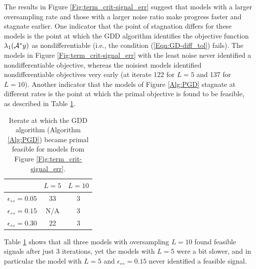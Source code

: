 The results in Figure \ref{Fig:term_crit-signal_err} suggest that models with a larger oversampling rate and those with a larger noise ratio make progress faster and stagnate earlier.  One indicator that the point of stagnation differs for these models is the point at which the GDD algorithm identifies the objective function $\lambda_1({\mathcal A}^*y)$ as nondifferentiable (i.e., the condition (\ref{Eqn:GD-diff_tol}) fails).  The models in Figure \ref{Fig:term_crit-signal_err} with the least noise never identified a nondifferentiable objective, whereas the noisiest models identified nondifferentiable objectives very early (at iterate 122 for $L=5$ and 137 for $L=10$).  Another indicator that the models of Figure \ref{Alg:PGD} stagnate at different rates is the point at which the primal objective is found to be feasible, as described in Table \ref{Tab:term_crit-pr_feas_faster_for_big_L_noise}.

\begin{table}[H]
\centering
\begin{tabular}{ |c|c|c| }
\hline
&	$L = 5$
	&	$L = 10$	\\
 \hline
$\epsilon_\rel = 0.05$
&     33 &   3 		\\
 \hline
$\epsilon_\rel = 0.15$
&  N/A &  3 	\\
 \hline
$\epsilon_\rel = 0.30$
&  22 &  3	\\
 \hline
\end{tabular}
\vspace{0.5cm}
\caption{Iterate at which the GDD algorithm (Algorithm \ref{Alg:PGD}) became primal feasible for models from Figure \ref{Fig:term_crit-signal_err}.}
	\label{Tab:term_crit-pr_feas_faster_for_big_L_noise}
\end{table}

Table \ref{Tab:term_crit-pr_feas_faster_for_big_L_noise} shows that all three models with oversampling $L = 10$ found feasible signals after just 3 iterations, yet the models with $L = 5$ were a bit slower, and in particular the model with $L = 5$ and $\epsilon_\rel = 0.15$ never identified a feasible signal.


